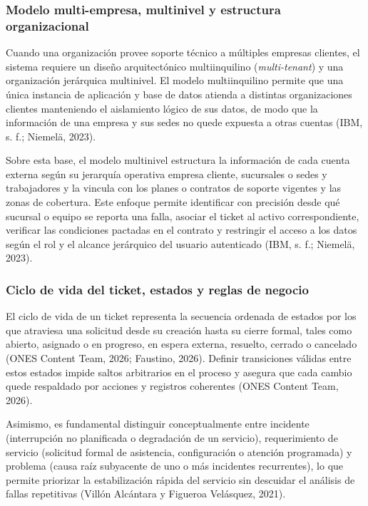 \subsubsection{Modelo multi-empresa, multinivel y estructura organizacional}
Cuando una organización provee soporte técnico a múltiples empresas clientes, el sistema requiere un diseño arquitectónico multiinquilino (\textit{multi-tenant}) y una organización jerárquica multinivel. El modelo multiinquilino permite que una única instancia de aplicación y base de datos atienda a distintas organizaciones clientes manteniendo el aislamiento lógico de sus datos, de modo que la información de una empresa y sus sedes no quede expuesta a otras cuentas (IBM, s. f.; Niemelä, 2023).

Sobre esta base, el modelo multinivel estructura la información de cada cuenta externa según su jerarquía operativa empresa cliente, sucursales o sedes y trabajadores y la vincula con los planes o contratos de soporte vigentes y las zonas de cobertura. Este enfoque permite identificar con precisión desde qué sucursal o equipo se reporta una falla, asociar el ticket al activo correspondiente, verificar las condiciones pactadas en el contrato y restringir el acceso a los datos según el rol y el alcance jerárquico del usuario autenticado (IBM, s. f.; Niemelä, 2023).

\subsubsection{Ciclo de vida del ticket, estados y reglas de negocio}
El ciclo de vida de un ticket representa la secuencia ordenada de estados por los que atraviesa una solicitud desde su creación hasta su cierre formal, tales como abierto, asignado o en progreso, en espera externa, resuelto, cerrado o cancelado (ONES Content Team, 2026; Faustino, 2026). Definir transiciones válidas entre estos estados impide saltos arbitrarios en el proceso y asegura que cada cambio quede respaldado por acciones y registros coherentes (ONES Content Team, 2026).

Asimismo, es fundamental distinguir conceptualmente entre incidente (interrupción no planificada o degradación de un servicio), requerimiento de servicio (solicitud formal de asistencia, configuración o atención programada) y problema (causa raíz subyacente de uno o más incidentes recurrentes), lo que permite priorizar la estabilización rápida del servicio sin descuidar el análisis de fallas repetitivas (Villón Alcántara y Figueroa Velásquez, 2021).

